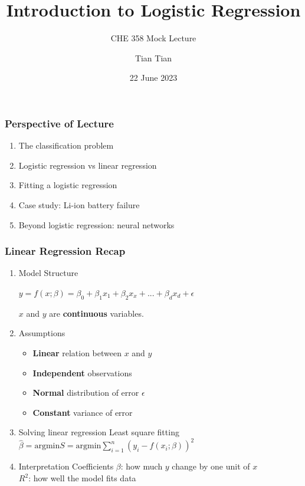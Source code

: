 \documentclass[10pt,aspectratio=169]{beamer}
\title{\Large \bfseries Introduction to Logistic Regression}
\subtitle{\large CHE 358 Mock Lecture}
\author{\large Tian Tian}
\date{\large 22 June 2023}
\begin{document}
 {  \frame{\titlepage} }


\begin{frame}[c]
  \frametitle{Perspective of Lecture}
  \begin{enumerate}
  \item The classification problem \vfill \item Logistic regression vs
    linear regression \vfill \item Fitting a logistic regression
    \vfill \item Case study: Li-ion battery failure \vfill \item
    Beyond logistic regression: neural networks
  \end{enumerate}
\end{frame}


\begin{frame}
  \frametitle{Linear Regression Recap}
  \begin{enumerate}
  \item Model Structure

    \vfill
    $y = f(x; \beta) = β_{0} + β_{1} x_{1} + β_{2} x_{x} + ... + β_{d}
    x_{d} + \epsilon$

    $x$ and $y$ are \textbf{continuous} variables.
    
    \vfill \item Assumptions

    \vfill
    \begin{itemize}
    \item \textbf{Linear} relation between $x$ and $y$
    \item \textbf{Independent} observations
    \item \textbf{Normal} distribution of error $\epsilon$
    \item \textbf{Constant} variance of error
    \end{itemize}


 
    \vfill \item Solving linear regression \vfill Least square fitting
    $\hat{\beta} = \mathrm{argmin} S = \mathrm{argmin} \sum_{i=1}^{n}
    (y_{i} - f(x_{i}; \beta))^{2}$
    
    \vfill \item Interpretation \vfill
    Coefficients $\beta$: how much $y$ change by one unit of $x$\\
    $R^{2}$: how well the model fits data
    
    
  \end{enumerate}

\end{frame}
\end{document}

